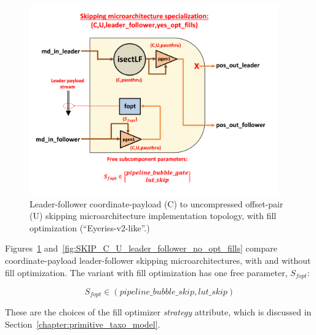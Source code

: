 \begin{figure}[H]
    \centering
    \includegraphics[width=0.95\textwidth]{figures/SKIP_C_U_leader_follower_yes_opt_fills.png}
    \caption{Leader-follower coordinate-payload (C) to uncompressed offset-pair (U) skipping microarchitecture implementation topology, with fill optimization (``Eyeriss-v2-like''\cite{eyerissv2}.)}
    \label{fig:SKIP_C_U_leader_follower_yes_opt_fills}
\end{figure}

Figures~\ref{fig:SKIP_C_U_leader_follower_yes_opt_fills} and~\ref{fig:SKIP_C_U_leader_follower_no_opt_fills} compare coordinate-payload leader-follower skipping microarchitectures, with and without fill optimization. The variant with fill optimization has one free parameter, $S_{fopt}$:

\[S_{fopt} \in (pipeline\_bubble\_skip,lut\_skip)\]

These are the choices of the fill optimizer \textit{strategy} attribute, which is discussed in Section~\ref{chapter:primitive_taxo_model}.

